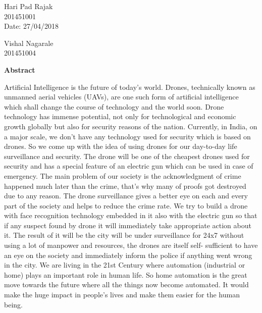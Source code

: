 \documentclass[12pt, oneside]{report}
\numberwithin{equation}{section}
\begin{document}
\begin{multicols}{2}
\begin{minipage}{\textwidth}

Hari Pad Rajak \\
201451001\\

\vspace*{\fill}
\vspace{1cm}
Date: 27/04/2018

\end{minipage}
Vishal Nagarale \\
201451004

\end{multicols}



\newpage
{}

\centerline{{\bf {\large Abstract}}}
\justify
Artificial Intelligence is the future of today’s world. Drones, technically known as unmanned
aerial vehicles (UAVs), are one such form of artificial intelligence which shall change the
course of technology and the world soon. Drone technology has immense potential, not only
for technological and economic growth globally but also for security reasons of the nation.
Currently, in India, on a major scale, we don't have any technology used for security which
is based on drones. So we come up with the idea of using drones for our day-to-day life
surveillance and security. The drone will be one of the cheapest drones used for security and
has a special feature of an electric gun which can be used in case of emergency. The main
problem of our society is the acknowledgment of crime happened much later than the crime,
that’s why many of proofs got destroyed due to any reason. The drone surveillance gives a
better eye on each and every part of the society and helps to reduce the crime rate. We try to
build a drone with face recognition technology embedded in it also with the electric gun so that
if any suspect found by drone it will immediately take appropriate action about it. The result
of it will be the city will be under surveillance for 24x7 without using a lot of manpower and
resources, the drones are itself self- sufficient to have an eye on the society and immediately
inform the police if anything went wrong in the city. We are living in the 21st Century where
automation (industrial or home) plays an important role in human life. So home automation
is the great move towards the future where all the things now become automated. It would make the huge impact in people’s lives and make them easier for the human being.
\end{document}
